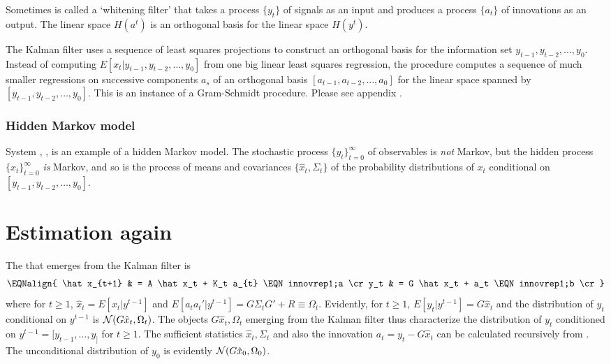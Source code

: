 Sometimes  is called a `whitening filter' that takes a  process $\{y_t\}$ of signals as an input and produces a process $\{a_t\}$ of
innovations as an output. The linear space $H(a^t)$ is an orthogonal basis for the linear space $H(y^t)$.

The Kalman filter  uses a sequence of least squares projections to  construct an orthogonal
basis for the information set $y_{t-1}, y_{t-2}, \ldots, y_0$.  Instead of computing $E [x_t | y_{t-1}, y_{t-2}, \ldots, y_0]$ from
one big linear least squares regression, the procedure  computes a sequence of much smaller regressions on successive components
$a_s$ of an orthogonal basis $[a_{t-1}, a_{t-2}, \ldots, a_0]$ for the linear space spanned by
$[y_{t-1}, y_{t-2}, \ldots, y_0]$. This is an instance of a  Gram-Schmidt procedure. Please see appendix .
%

\subsubsection{Hidden Markov model}

System  , ,  is an example of a hidden Markov model.  The stochastic process $\{y_t\}_{t=0}^\infty$ of observables is
{\it not\/} Markov,
 but the hidden
process $\{x_t\}_{t=0}^\infty$ {\it is\/} Markov, and so is the   process of means and covariances  $\{\hat x_t, \Sigma_t\}$
of the  probability distributions of   $x_t$ conditional on $[y_{t-1}, y_{t-2}, \ldots, y_0]$.
%



\section{Estimation again}\label{sec:estimation2}%
The  that emerges from the Kalman filter
is
$$ \EQNalign{ \hat x_{t+1} & = A \hat x_t + K_t a_{t} \EQN innovrep1;a \cr
            y_t & = G \hat x_t + a_t \EQN innovrep1;b \cr} $$
where for $t\geq 1$, $\hat x_t = E[x_t | y^{t-1}]$ and $E [a_t a_t'|y^{t-1}] = G \Sigma_t G' + R \equiv \Omega_t$.
Evidently, for $t \geq 1$,  $ E [y_t | y^{t-1}] = G \hat x_{t}$ and
the  distribution of $y_t$ conditional on $y^{t-1}$ is ${\cal N}(G \hat x_{t}, \Omega_t)$.  The objects
$G \hat x_{t}, \Omega_t$ emerging from the Kalman filter  thus characterize  the
distribution of $y_t$ conditioned on $y^{t-1}= [y_{t-1}, \ldots, y_]$ for $ t \geq 1$.  The sufficient statistics $\hat x_t, \Sigma_t$ and also the innovation
$a_t = y_t - G \hat x_t$ can be calculated recursively from .  The unconditional distribution of
$y_0$ is evidently ${\cal N}(G \hat x_0, \Omega_0)$.

